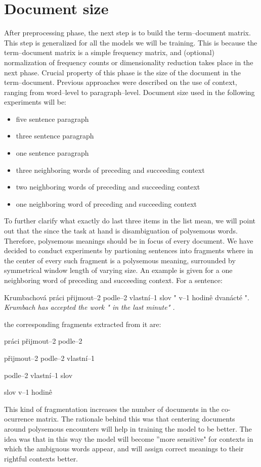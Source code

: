 \section{Document size}
After preprocessing phase, the next step is to build the term--document matrix. This step is generalized for all the models we will be training. This is because the term--document matrix is a simple frequency matrix, and (optional) normalization of frequency counts or dimensionality reduction takes place in the next phase. Crucial property of this phase is the size of the document in the term--document. Previous approaches were described on the use of context, ranging from word--level to paragraph--level. Document size used in the following experiments will be: 
\begin{itemize}
\item five sentence paragraph
\item three sentence paragraph
\item one sentence paragraph
\item three neighboring words of preceding and succeeding context
\item two neighboring words of preceding and succeeding context
\item one neighboring word of preceding and succeeding context
\end{itemize}
To further clarify what exactly do last three items in the list mean, we will point out that the since the task
at hand is disambiguation of polysemous words. Therefore, polysemous meanings should be in focus of
every document. We have decided to conduct experiments by partioning sentences into fragments where 
in the center of every such fragment is a polysemous meaning, surrounded by symmetrical window 
length of varying size. An example is given for a one neighboring word of preceding and succeeding context. For a sentence:
\begin{examples}
\item Krumbachov\'a pr\'aci p\v{r}ijmout--2 podle--2 vlastn\'i--1 slov " v--1 hodin\^e dvan\'act\'e ".
\glt \textit{  Krumbach has accepted the work " in the last minute" .}
\end{examples}
the corresponding fragments extracted from it are:
\begin{examples}
\item pr\'aci p\v{r}ijmout--2 podle--2
\item p\v{r}ijmout--2 podle--2 vlastn\'i--1
\item podle--2 vlastn\'i--1 slov
\item slov v--1 hodin\^e
\end{examples}
This kind of fragmentation increases the number of documents in the co-ocurrence matrix. The rationale behind this was that centering documents around polysemous encounters will help in training the model to be better. The idea was that in this way the model will become ''more sensitive" for contexts in which the ambiguous words appear, and will assign correct meanings to their rightful contexts better. 

